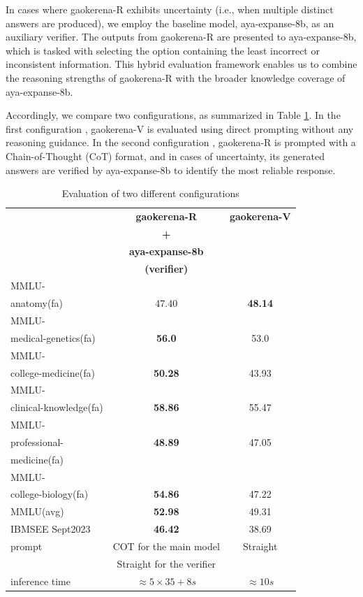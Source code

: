 \documentclass[conference]{IEEEtran}
\begin{document}
In cases where gaokerena-R exhibits uncertainty (i.e., when multiple distinct answers are produced), we employ the baseline model, aya-expanse-8b, as an auxiliary verifier. The outputs from gaokerena-R are presented to aya-expanse-8b, which is tasked with selecting the option containing the least incorrect or inconsistent information. This hybrid evaluation framework enables us to combine the reasoning strengths of gaokerena-R with the broader knowledge coverage of aya-expanse-8b. 

Accordingly, we compare two configurations, as summarized in Table
\ref{tab:med_opns_comparison}.
 In the first configuration , gaokerena-V is evaluated using direct prompting without any reasoning guidance. In the second configuration , gaokerena-R is prompted with a Chain-of-Thought (CoT) format, and in cases of uncertainty, its generated answers are verified by aya-expanse-8b to identify the most reliable response.

	\begin{table}[ht]
		\centering
		\caption{Evaluation of two different configurations}
		\begin{tabular}{|l|c|c|}  
			\hline
			\textbf{} & \textbf{gaokerena-R} & \textbf{gaokerena-V}  \\ 
			& \textbf{+} &   \\
			& \textbf{ aya-expanse-8b}  &     \\ 
                        & \textbf{(verifier)}  &     \\ \hline
			MMLU- &  &    \\ 
			anatomy(fa)  & 47.40  & \textbf{48.14}   \\ \hline
			MMLU- &   &      \\
			medical-genetics(fa) & \textbf{56.0}  & 53.0   \\ \hline
			MMLU- &  &      \\
			college-medicine(fa) & \textbf{50.28} & 43.93    \\ \hline
			MMLU- &    &    \\
			clinical-knowledge(fa) & \textbf{58.86}  & 55.47  \\ \hline
			MMLU- &  &    \\
			professional-& \textbf{48.89} & 47.05  \\
                        medicine(fa)& &      \\ \hline
			MMLU- &  &   \\
			college-biology(fa)& \textbf{54.86} & 47.22   \\ \hline
			MMLU(avg) & \textbf{52.98}  & 49.31   \\ \hline
			IBMSEE Sept2023 & \textbf{46.42}  &38.69   \\ \hline
                        prompt & COT for the main model & Straight   \\ 
                        &            Straight for the verifier   &   \\ \hline
			inference time & $\approx 5 \times 35 + 8 s$ & $\approx 10s$  \\  \hline
		\end{tabular}
		\label{tab:med_opns_comparison}
	\end{table}
\end{document}

